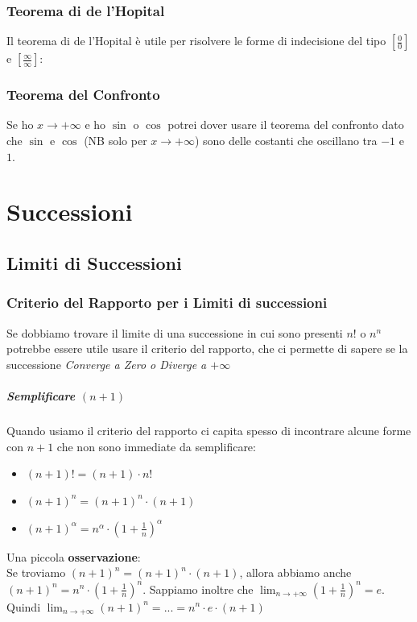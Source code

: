 \documentclass[12pt, a4paper, openany]{book}
\begin{document}
\subsection{Teorema di de l'Hopital}
Il teorema di de l'Hopital è utile per risolvere le forme di indecisione del tipo $[\frac{0}{0}]$ e $[\frac{\infty}{\infty}]$:


\subsection{Teorema del Confronto} Se ho $x \rightarrow +\infty$ e ho $\sin$ o  $\cos$ potrei dover usare
il teorema del confronto dato che $\sin$ e $\cos$ (NB solo per $x \rightarrow +\infty$)
sono delle costanti che oscillano tra $-1$ e $1$.

\chapter{Successioni}

\section{Limiti di Successioni}

\subsection{Criterio del Rapporto per i Limiti di successioni}
Se dobbiamo trovare il limite di una successione in cui sono presenti $n!$ o $n^n$
potrebbe essere utile usare il criterio del rapporto, che ci permette di sapere se la successione
\emph{Converge a Zero o Diverge a $+\infty$}

\paragraph*{Semplificare $(n+1)$}
Quando usiamo il criterio del rapporto ci capita spesso di incontrare alcune forme con $n+1$ che non sono immediate da semplificare:
\begin{itemize}
	\item $(n+1)! = (n+1) \cdot n!$
	\item $(n+1)^n = (n+1)^n \cdot (n+1)$
	\item $(n+1)^{\alpha} = n^{\alpha} \cdot (1+\frac{1}{n})^\alpha$ 
\end{itemize}
Una piccola \textbf{osservazione}:
\\Se troviamo $(n+1)^n = (n+1)^n \cdot (n+1)$, allora abbiamo anche $(n+1)^{n} = n^{n} \cdot (1+\frac{1}{n})^ n$.
Sappiamo inoltre che $\lim_{n\to +\infty}(1+\frac{1}{n})^n = e$.
\\Quindi $\lim_{n\to +\infty}(n+1)^n = ... = n^n \cdot e \cdot (n+1)$
\end{document}
